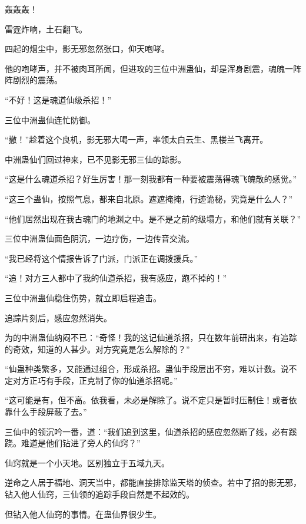 
\begin{this_body}



轰轰轰！

雷霆炸响，土石翻飞。

四起的烟尘中，影无邪忽然张口，仰天咆哮。

他的咆哮声，并不被肉耳所闻，但进攻的三位中洲蛊仙，却是浑身剧震，魂魄一阵阵剧烈的震荡。

“不好！这是魂道仙级杀招！”

三位中洲蛊仙连忙防御。

“撤！”趁着这个良机，影无邪大喝一声，率领太白云生、黑楼兰飞离开。

中洲蛊仙们回过神来，已不见影无邪三仙的踪影。

“这是什么魂道杀招？好生厉害！那一刻我都有一种要被震荡得魂飞魄散的感觉。”

“这三个蛊仙，按照气息，都来自北原。遮遮掩掩，行迹诡秘，究竟是什么人？”

“他们居然出现在我古魂门的地渊之中。是不是之前的级塌方，和他们就有关联？”

三位中洲蛊仙面色阴沉，一边疗伤，一边传音交流。

“我已经将这个情报告诉了门派，门派正在调拨援兵。”

“追！对方三人都中了我的仙道杀招，我有感应，跑不掉的！”

三位中洲蛊仙稳住伤势，就立即启程追击。

追踪片刻后，感应忽然消失。

为的中洲蛊仙纳闷不已：“奇怪！我的这记仙道杀招，只在数年前研出来，有追踪的奇效，知道的人甚少。对方究竟是怎么解除的？”

“仙蛊种类繁多，又能通过组合，形成杀招。蛊仙手段层出不穷，难以计数。说不定对方正巧有手段，正克制了你的仙道杀招呢。”

“这可能是有，但不高。依我看，未必是解除了。说不定只是暂时压制住！或者依靠什么手段屏蔽了去。”

三仙中的领沉吟一番，道：“我们追到这里，仙道杀招的感应忽然断了线，必有蹊跷。难道是他们钻进了旁人的仙窍？”

仙窍就是一个小天地。区别独立于五域九天。

逆命之人居于福地、洞天当中，都能直接排除监天塔的侦查。若中了招的影无邪，钻入他人仙窍，三仙领的追踪手段自然是不起效的。

但钻入他人仙窍的事情。在蛊仙界很少生。


\end{this_body}
